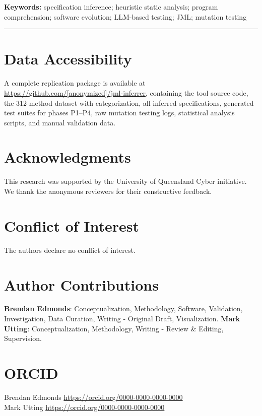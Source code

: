 \documentclass[11pt]{article}
\begin{document}
\vspace{1em}

\noindent\textbf{Keywords:} specification inference; heuristic static analysis; program comprehension; software evolution; LLM-based testing; JML; mutation testing

\vspace{1em}
\hrule
\vspace{1em}











\section*{Data Accessibility}

A complete replication package is available at \url{https://github.com/[anonymized]/jml-inferrer}, containing the tool source code, the 312-method dataset with categorization, all inferred specifications, generated test suites for phases P1--P4, raw mutation testing logs, statistical analysis scripts, and manual validation data.

\section*{Acknowledgments}

This research was supported by the University of Queensland Cyber initiative. We thank the anonymous reviewers for their constructive feedback.

\section*{Conflict of Interest}

The authors declare no conflict of interest.

\section*{Author Contributions}

\textbf{Brendan Edmonds}: Conceptualization, Methodology, Software, Validation, Investigation, Data Curation, Writing - Original Draft, Visualization. \textbf{Mark Utting}: Conceptualization, Methodology, Writing - Review \& Editing, Supervision.

\section*{ORCID}

Brendan Edmonds \url{https://orcid.org/0000-0000-0000-0000}\\
Mark Utting \url{https://orcid.org/0000-0000-0000-0000}



\end{document}

